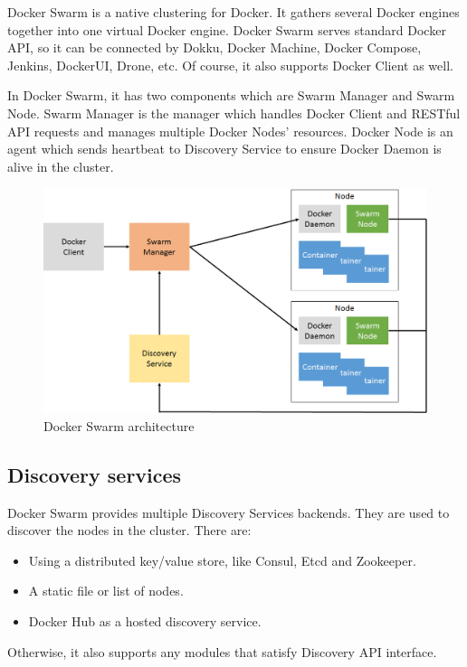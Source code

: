 Docker Swarm is a native clustering for Docker. It gathers several Docker engines together into one virtual Docker engine. Docker Swarm serves standard Docker API, so it can be connected by Dokku, Docker Machine, Docker Compose, Jenkins, DockerUI, Drone, etc. Of course, it also supports Docker Client as well.

In Docker Swarm, it has two components which are Swarm Manager and Swarm Node. Swarm Manager is the manager which handles Docker Client and RESTful API requests and manages multiple Docker Nodes' resources. Docker Node is an agent which sends heartbeat to Discovery Service to ensure Docker Daemon is alive in the cluster.

\begin{figure}[h]
\begin{center}
\includegraphics[width=15cm]{figure/swarm_docker.png}
\end{center}
\caption{Docker Swarm architecture}
\end{figure}

\subsection{Discovery services}
Docker Swarm provides multiple Discovery Services backends. They are used to discover the nodes in the cluster. There are:
\begin{itemize}
    \item Using a distributed key/value store, like Consul, Etcd and Zookeeper.
    \item A static file or list of nodes.
    \item Docker Hub as a hosted discovery service.
\end{itemize}
Otherwise, it also supports any modules that satisfy Discovery API interface.

